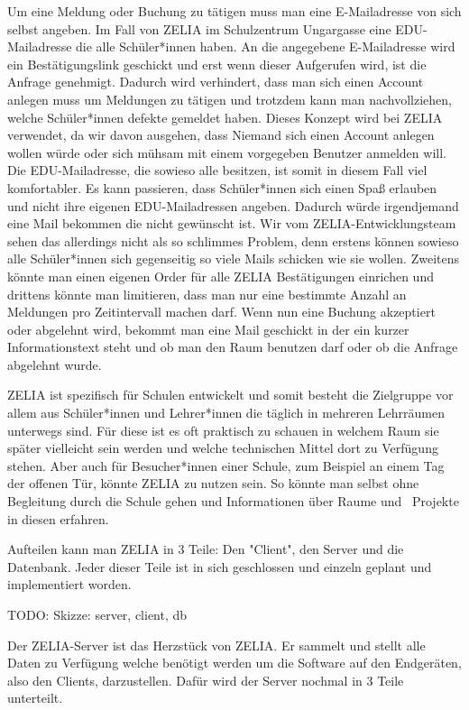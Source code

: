 Um eine Meldung oder Buchung zu tätigen muss man eine E-Mailadresse von sich selbst angeben. Im Fall von ZELIA im Schulzentrum Ungargasse eine EDU-Mailadresse die alle Schüler*innen haben. An die angegebene E-Mailadresse wird ein Bestätigungslink geschickt und erst wenn dieser Aufgerufen wird, ist die Anfrage genehmigt. Dadurch wird verhindert, dass man sich einen Account anlegen muss um Meldungen zu tätigen und trotzdem kann man nachvollziehen, welche Schüler*innen defekte gemeldet haben. Dieses Konzept wird bei ZELIA verwendet, da wir davon ausgehen, dass Niemand sich einen Account anlegen wollen würde oder sich mühsam mit einem vorgegeben Benutzer anmelden will. Die EDU-Mailadresse, die sowieso alle besitzen, ist somit in diesem Fall viel komfortabler. Es kann passieren, dass Schüler*innen sich einen Spaß erlauben und nicht ihre eigenen EDU-Mailadressen angeben. Dadurch würde irgendjemand eine Mail bekommen die nicht gewünscht ist. Wir vom ZELIA-Entwicklungsteam sehen das allerdings nicht als so schlimmes Problem, denn erstens können sowieso alle Schüler*innen sich gegenseitig so viele Mails schicken wie sie wollen. Zweitens könnte man einen eigenen Order für alle ZELIA Bestätigungen einrichen und drittens könnte man limitieren, dass man nur eine bestimmte Anzahl an Meldungen pro Zeitintervall machen darf. Wenn nun eine Buchung akzeptiert oder abgelehnt wird, bekommt man eine Mail geschickt in der ein kurzer Informationstext steht und ob man den Raum benutzen darf oder ob die Anfrage abgelehnt wurde.

ZELIA ist spezifisch für Schulen entwickelt und somit besteht die Zielgruppe vor allem aus Schüler*innen und Lehrer*innen die täglich in mehreren Lehrräumen unterwegs sind. Für diese ist es oft praktisch zu schauen in welchem Raum sie später vielleicht sein werden und welche technischen Mittel dort zu Verfügung stehen. Aber auch für Besucher*innen einer Schule, zum Beispiel an einem Tag der offenen Tür, könnte ZELIA zu nutzen sein. So könnte man selbst ohne Begleitung durch die Schule gehen und Informationen über Raume und \zb\ Projekte in diesen erfahren.

Aufteilen kann man ZELIA in 3 Teile: Den "Client", den Server und die Datenbank. Jeder dieser Teile ist in sich geschlossen und einzeln geplant und implementiert worden.

TODO: Skizze: server, client, db


Der ZELIA-Server ist das Herzstück von ZELIA. Er sammelt und stellt alle Daten zu Verfügung welche benötigt werden um die Software auf den Endgeräten, also den Clients, darzustellen. Dafür wird der Server nochmal in 3 Teile unterteilt.

